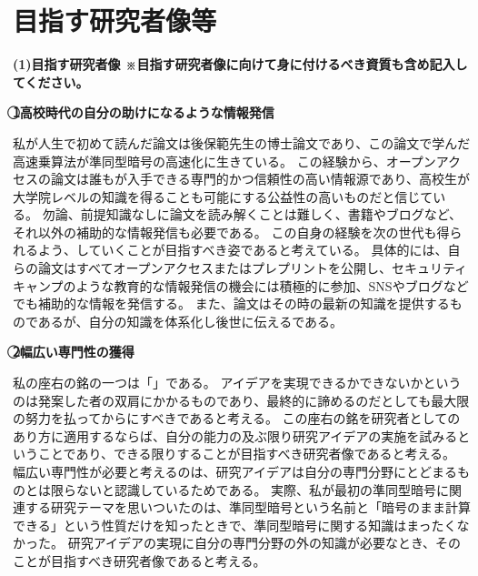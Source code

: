 
\section{目指す研究者像等}

\noindent
\textbf{(1)目指す研究者像 {\footnotesize ※目指す研究者像に向けて身に付けるべき資質も含め記入してください。}}


\noindent\textbf{\textcircled{1}高校時代の自分の助けになるような情報発信}

私が人生で初めて読んだ論文は後保範先生の博士論文であり、この論文で学んだ高速乗算法が準同型暗号の高速化に生きている。
この経験から、オープンアクセスの論文は誰もが入手できる専門的かつ信頼性の高い情報源であり、高校生が大学院レベルの知識を得ることも可能にする公益性の高いものだと信じている。
勿論、前提知識なしに論文を読み解くことは難しく、書籍やブログなど、それ以外の補助的な情報発信も必要である。
この自身の経験を次の世代も得られるよう、していくことが目指すべき姿であると考えている。
具体的には、自らの論文はすべてオープンアクセスまたはプレプリントを公開し、セキュリティキャンプのような教育的な情報発信の機会には積極的に参加、SNSやブログなどでも補助的な情報を発信する。
また、論文はその時の最新の知識を提供するものであるが、自分の知識を体系化し後世に伝えるである。

\noindent\textbf{\textcircled{2}幅広い専門性の獲得}

私の座右の銘の一つは「」である。
アイデアを実現できるかできないかというのは発案した者の双肩にかかるものであり、最終的に諦めるのだとしても最大限の努力を払ってからにすべきであると考える。
この座右の銘を研究者としてのあり方に適用するならば、自分の能力の及ぶ限り研究アイデアの実施を試みるということであり、できる限りすることが目指すべき研究者像であると考える。
幅広い専門性が必要と考えるのは、研究アイデアは自分の専門分野にとどまるものとは限らないと認識しているためである。
実際、私が最初の準同型暗号に関連する研究テーマを思いついたのは、準同型暗号という名前と「暗号のまま計算できる」という性質だけを知ったときで、準同型暗号に関する知識はまったくなかった。
研究アイデアの実現に自分の専門分野の外の知識が必要なとき、そのことが目指すべき研究者像であると考える。

